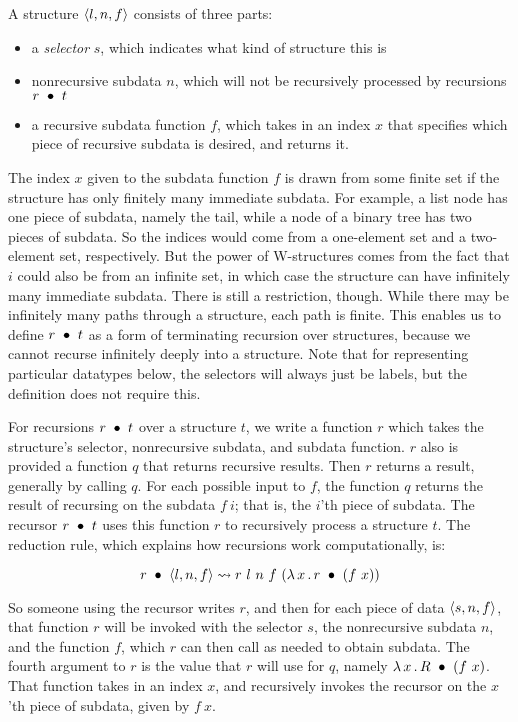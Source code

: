 \documentclass{article}
\begin{document}
A structure $\langle l , n, f \rangle$ consists of three parts:
\begin{itemize}
\item a \emph{selector} $s$, which indicates what kind of structure this is
\item nonrecursive subdata $n$, which will not be recursively processed
  by recursions $r\ \bullet\ t$
\item a recursive subdata function $f$, which takes in an index $x$
  that specifies which piece of recursive subdata is desired, and
  returns it.
  \end{itemize}

\noindent The index $x$ given to the subdata function $f$ is drawn
from some finite set if the structure has only finitely many immediate
subdata.  For example, a list node has one piece of subdata, namely
the tail, while a node of a binary tree has two pieces of subdata.  So
the indices would come from a one-element set and a two-element set,
respectively.  But the power of W-structures comes from the fact that
$i$ could also be from an infinite set, in which case the structure
can have infinitely many immediate subdata.  There is still a
restriction, though.  While there may be infinitely many paths through
a structure, each path is finite.  This enables us to define
$r\ \bullet\ t$ as a form of terminating recursion over structures,
because we cannot recurse infinitely deeply into a structure.  Note
that for representing particular datatypes below, the selectors will
always just be labels, but the definition does not require this.

For recursions $r\ \bullet\ t$ over a structure $t$, we write a function
$r$ which takes the structure's selector, nonrecursive subdata, and
subdata function.  $r$ also is provided a function $q$ that returns
recursive results.  Then $r$  returns a result, generally by calling
$q$.  For each possible input to $f$, the function $q$ returns the
result of recursing on the subdata $f\ i$; that is, the $i$'th piece
of subdata.  The recursor $r\ \bullet\ t$ uses this function $r$ to
recursively process a structure $t$. The reduction rule, which
explains how recursions work computationally, is:

\[
\wrec{r}{\ctor{l}{n}{f}} \leadsto r\ l\ n\ f\ (\lam{x}{\wrec{r}{(f\ x)}})
\]

\noindent So someone using the recursor writes $r$, and then for each
piece of data $\langle s , n, f \rangle$, that function $r$ will be invoked with
the selector $s$, the nonrecursive subdata $n$, and the function $f$,
which $r$ can then call as needed to obtain subdata.  The fourth
argument to $r$ is the value that $r$ will use for $q$, namely
$\lambda\, x\, .\, R\ \bullet\ (f\ x)$.  That function takes in an index $x$, and
recursively invokes the recursor on the $x$'th piece of subdata, given
by $f\ x$.  
\end{document}

